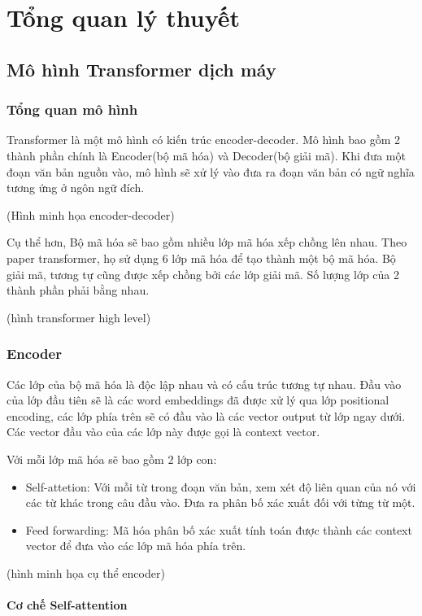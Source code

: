 \chapter{Tổng quan lý thuyết}
\label{Chapter2}
\section{Mô hình Transformer dịch máy}

\subsection{Tổng quan mô hình}

Transformer là một mô hình có kiến trúc encoder-decoder. Mô hình bao gồm 2 thành phần chính là Encoder(bộ mã hóa) và Decoder(bộ giải mã). Khi đưa một đoạn văn bản nguồn vào, mô hình sẽ xử lý vào đưa ra đoạn văn bản có ngữ nghĩa tương ứng ở ngôn ngữ đích.

(Hình minh họa encoder-decoder)

Cụ thể hơn, Bộ mã hóa sẽ bao gồm nhiều lớp mã hóa xếp chồng lên nhau. Theo paper transformer, họ sử dụng 6 lớp mã hóa để tạo thành một bộ mã hóa.  Bộ giải mã, tương tự cũng được xếp chồng bởi các lớp giải mã. Số lượng lớp của 2 thành phần phải bằng nhau.

(hình transformer high level)


\subsection{Encoder}
Các lớp của bộ mã hóa là độc lập nhau và có cấu trúc tương tự nhau. Đầu vào của lớp đầu tiên sẽ là các word embeddings đã được xử lý qua lớp positional encoding, các lớp phía trên sẽ có đầu vào là các vector output từ lớp ngay dưới. Các vector đầu vào của các lớp này được gọi là context vector.

Với mỗi lớp mã hóa sẽ bao gồm 2 lớp con:
\begin{itemize}
	\item Self-attetion: Với mỗi từ trong đoạn văn bản, xem xét độ liên quan của nó với các từ khác trong câu đầu vào. Đưa ra phân bố xác xuất đối với từng từ một.
	\item Feed forwarding: Mã hóa phân bố xác xuất tính toán được thành các context vector để đưa vào các lớp mã hóa phía trên.
\end{itemize}

(hình minh họa cụ thể encoder)

\subsubsection{Cơ chế Self-attention}

